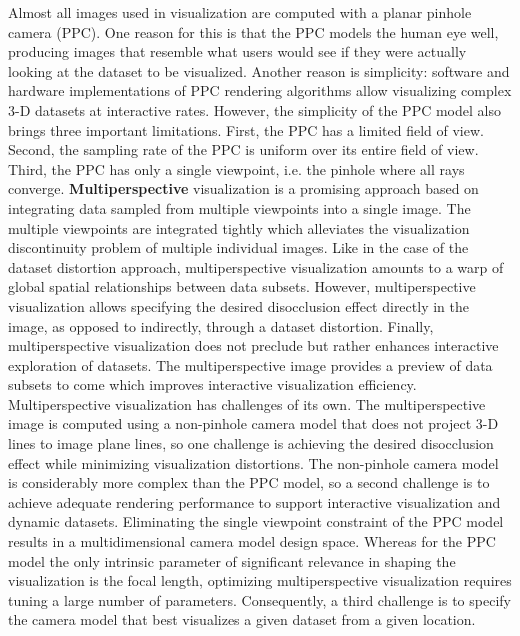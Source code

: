 Almost all images used in visualization are computed with a planar pinhole camera (PPC). One reason for this is that the PPC models the
human eye well, producing images that resemble what users would
see if they were actually looking at the dataset to be visualized.
Another reason is simplicity: software and hardware
implementations of PPC rendering algorithms allow visualizing
complex 3-D datasets at interactive rates. However, the simplicity of
the PPC model also brings three important limitations. First, the PPC
has a limited field of view. Second, the sampling rate of the PPC is
uniform over its entire field of view. Third, the PPC has only a single
viewpoint, i.e. the pinhole where all rays converge.
\newline \textbf{Multiperspective }  visualization is a promising approach based on
integrating data sampled from multiple viewpoints into a single
image. The multiple viewpoints are integrated tightly which
alleviates the visualization discontinuity problem of multiple
individual images. Like in the case of the dataset distortion approach,
multiperspective visualization amounts to a warp of global spatial
relationships between data subsets. However, multiperspective
visualization allows specifying the desired disocclusion effect
directly in the image, as opposed to indirectly, through a dataset
distortion. Finally, multiperspective visualization does not preclude
but rather enhances interactive exploration of datasets. The
multiperspective image provides a preview of data subsets to come
which improves interactive visualization efficiency. Multiperspective visualization has challenges of its own. The
multiperspective image is computed using a non-pinhole camera
model that does not project 3-D lines to image plane lines, so one
challenge is achieving the desired disocclusion effect while
minimizing visualization distortions. The non-pinhole camera model
is considerably more complex than the PPC model, so a second
challenge is to achieve adequate rendering performance to support
interactive visualization and dynamic datasets. Eliminating the single
viewpoint constraint of the PPC model results in a multidimensional
camera model design space. Whereas for the PPC model the only
intrinsic parameter of significant relevance in shaping the
visualization is the focal length, optimizing multiperspective
visualization requires tuning a large number of parameters.
Consequently, a third challenge is to specify the camera model that
best visualizes a given dataset from a given location. \newline
